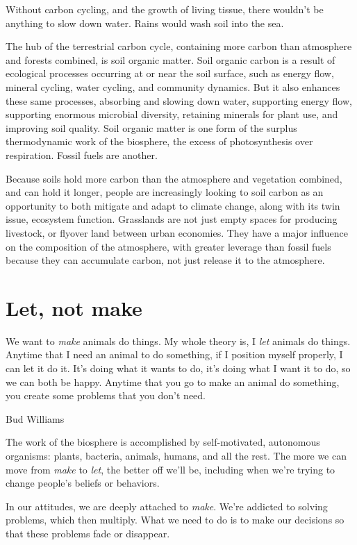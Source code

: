 \documentclass[11pt,letterpaper,oneside,onecolumn]{memoir}
\begin{document}
Without carbon cycling, and the growth of living tissue, there wouldn't be anything to slow down water. Rains would wash soil into the sea.

The hub of the terrestrial carbon cycle, containing more carbon than atmosphere and forests combined, is soil organic matter. Soil organic carbon is a result of ecological processes occurring at or near the soil surface, such as energy flow, mineral cycling, water cycling, and community dynamics. But it also enhances these same processes, absorbing and slowing down water, supporting energy flow, supporting enormous microbial diversity, retaining minerals for plant use, and improving soil quality. Soil organic matter is one form of the surplus thermodynamic work of the biosphere, the excess of photosynthesis over respiration. Fossil fuels are another.

Because soils hold more carbon than the atmosphere and vegetation combined, and can hold it longer, people are increasingly looking to soil carbon as an opportunity to both mitigate and adapt to climate change, along with its twin issue, ecosystem function. Grasslands are not just empty spaces for producing livestock, or flyover land between urban economies. They have a major influence on the composition of the atmosphere, with greater leverage than fossil fuels because they can accumulate carbon, not just release it to the atmosphere.

\section{Let, not make}

\epigraph{We want to \textit{make} animals do things. My whole theory is, I \textit{let} animals do things. Anytime that I need an animal to do something, if I position myself properly, I can let it do it. It's doing what it wants to do, it's doing what I want it to do, so we can both be happy. Anytime that you go to make an animal do something, you create some problems that you don't need.}{Bud Williams}

\noindent The work of the biosphere is accomplished by self-motivated, autonomous organisms: plants, bacteria, animals, humans, and all the rest. The more we can move from \textit{make} to \textit{let}, the better off we'll be, including when we're trying to change people's beliefs or behaviors.

In our attitudes, we are deeply attached to \textit{make}. We're addicted to solving problems, which then multiply. What we need to do is to make our decisions so that these problems fade or disappear.
\end{document}
